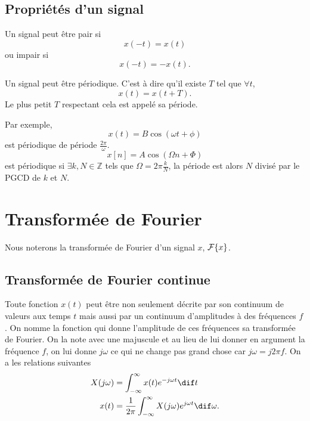 \subsection{Propriétés d'un signal}
Un signal peut être pair si
\[ x(-t) = x(t) \]
ou impair si
\[ x(-t) = -x(t). \]

Un signal peut être périodique.
C'est à dire qu'il existe $T$ tel que
$\forall t$,
\[ x(t) = x(t + T). \]
Le plus petit $T$ respectant cela est appelé sa période.

Par exemple,
\[ x(t) = B\cos(\omega t + \phi) \]
est périodique de période $\frac{2\pi}{\omega}$.
\[ x[n] = A\cos(\Omega n + \Phi) \]
est périodique si $\exists k, N \in \mathbb{Z}$ tels que
$\Omega = 2\pi\frac{k}{N}$, la période est alors $N$ divisé
par le PGCD de $k$ et $N$.

\section{Transformée de Fourier}
Nous noterons la transformée de Fourier d'un signal $x$, $\mathcal{F}\{x\}$.

\subsection{Transformée de Fourier continue}
Toute fonction $x(t)$ peut être non seulement décrite par son continuum de
valeurs aux temps $t$ mais aussi par un continuum d'amplitudes à des fréquences
$f$.
On nomme la fonction qui donne l'amplitude de ces fréquences sa transformée
de Fourier.
On la note avec une majuscule et au lieu de lui donner en argument la fréquence
$f$, on lui donne $j\omega$ ce qui ne change pas grand chose car
$j\omega = j2\pi f$.
On a les relations suivantes
\begin{align}
  \label{eq:tfc}
  X(j\omega) & = \int_{-\infty}^\infty x(t) e^{-j\omega t} \dif t\\
  \label{eq:tfci}
  x(t) & = \frac{1}{2\pi} \int_{-\infty}^\infty X(j\omega) e^{j\omega t}
  \dif \omega.
\end{align}

